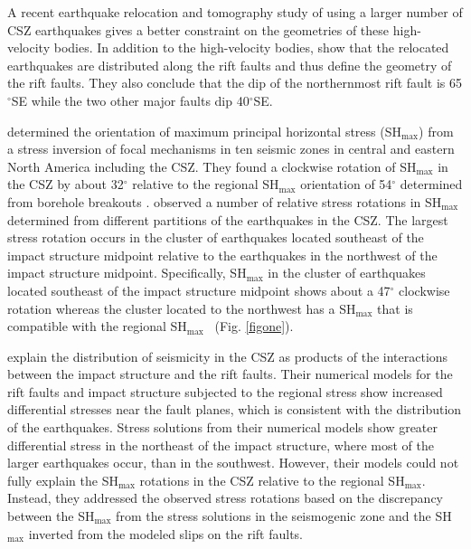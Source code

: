 \documentclass[draft]{agujournal2018}
\begin{document}
A recent earthquake relocation and tomography study of \citet{Powell_2017} using a larger number of CSZ earthquakes gives a better constraint on the geometries of these high-velocity bodies. In addition to the high-velocity bodies, \citet{Powell_2017} show that the relocated earthquakes are distributed along the rift faults and thus define the geometry of the rift faults. They also conclude that the dip of the northernmost rift fault is 65$^\circ$SE while the two other major faults dip 40$^\circ$SE. 

\citet{Mazzotti_2010} determined the orientation of maximum principal horizontal stress (SH$_{\max}$) from a stress inversion of focal mechanisms in ten seismic zones in central and eastern North America including the CSZ. They found a clockwise rotation of SH$_{\max}$ in the CSZ by about 32$^\circ$ relative to the regional SH$_{\max}$ orientation of 54$^\circ$ determined from borehole breakouts \citep{Zoback_1992,Mazzotti_2010}. \citet{Mazzotti_2010} observed a number of relative stress rotations in SH$_{\max}$ determined from different partitions of the earthquakes in the CSZ. The largest stress rotation occurs in the cluster of earthquakes located southeast of the impact structure midpoint relative to the earthquakes in the northwest of the impact structure midpoint. Specifically, SH$_{\max}$ in the cluster of earthquakes located southeast of the impact structure midpoint shows about a 47$^\circ$ clockwise rotation whereas the cluster located to the northwest has a SH$_{\max}$ that is compatible with the regional SH$_{\max}$~\citep{Mazzotti_2010} (Fig. \ref{figone}).

\citet{Baird_2010} explain the distribution of seismicity in the CSZ as products of the interactions between the impact structure and the rift faults. Their numerical models for the rift faults and impact structure subjected to the regional stress show increased differential stresses near the fault planes, which is consistent with the distribution of the earthquakes. Stress solutions from their numerical models show greater differential stress in the northeast of the impact structure, where most of the larger earthquakes occur, than in the southwest. However, their models could not fully explain the SH$_{\max}$ rotations in the CSZ relative to the regional SH$_{\max}$. Instead, they addressed the observed stress rotations based on the discrepancy between the SH$_{\max}$ from the stress solutions in the seismogenic zone and the SH$_{\max}$ inverted from the modeled slips on the rift faults.
\end{document}
